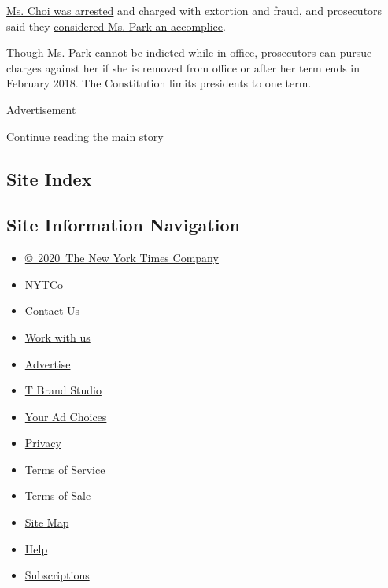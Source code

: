 \href{http://www.nytimes3xbfgragh.onion/2016/11/01/world/asia/south-korea-park-geun-hye-choi-soon-sil.html}{Ms.
Choi was arrested} and charged with extortion and fraud, and prosecutors
said they
\href{http://www.nytimes3xbfgragh.onion/2016/11/20/world/asia/park-geun-hye-south-korea-extortion-accomplice-prosecutors.html}{considered
Ms. Park an accomplice}.

Though Ms. Park cannot be indicted while in office, prosecutors can
pursue charges against her if she is removed from office or after her
term ends in February 2018. The Constitution limits presidents to one
term.

Advertisement

\protect\hyperlink{after-bottom}{Continue reading the main story}

\hypertarget{site-index}{%
\subsection{Site Index}\label{site-index}}

\hypertarget{site-information-navigation}{%
\subsection{Site Information
Navigation}\label{site-information-navigation}}

\begin{itemize}
\tightlist
\item
  \href{https://help.nytimes3xbfgragh.onion/hc/en-us/articles/115014792127-Copyright-notice}{©~2020~The
  New York Times Company}
\end{itemize}

\begin{itemize}
\tightlist
\item
  \href{https://www.nytco.com/}{NYTCo}
\item
  \href{https://help.nytimes3xbfgragh.onion/hc/en-us/articles/115015385887-Contact-Us}{Contact
  Us}
\item
  \href{https://www.nytco.com/careers/}{Work with us}
\item
  \href{https://nytmediakit.com/}{Advertise}
\item
  \href{http://www.tbrandstudio.com/}{T Brand Studio}
\item
  \href{https://www.nytimes3xbfgragh.onion/privacy/cookie-policy\#how-do-i-manage-trackers}{Your
  Ad Choices}
\item
  \href{https://www.nytimes3xbfgragh.onion/privacy}{Privacy}
\item
  \href{https://help.nytimes3xbfgragh.onion/hc/en-us/articles/115014893428-Terms-of-service}{Terms
  of Service}
\item
  \href{https://help.nytimes3xbfgragh.onion/hc/en-us/articles/115014893968-Terms-of-sale}{Terms
  of Sale}
\item
  \href{https://spiderbites.nytimes3xbfgragh.onion}{Site Map}
\item
  \href{https://help.nytimes3xbfgragh.onion/hc/en-us}{Help}
\item
  \href{https://www.nytimes3xbfgragh.onion/subscription?campaignId=37WXW}{Subscriptions}
\end{itemize}
